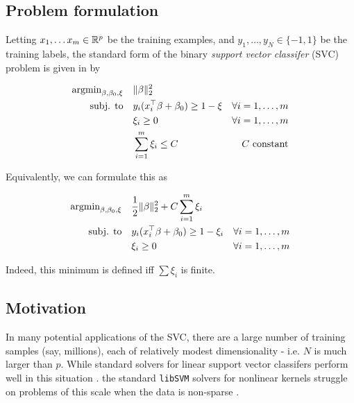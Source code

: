 \documentclass[11pt]{article}
\begin{document}
\subsection{Problem formulation}

Letting $x_1, \ldots x_m \in \mathbb{R}^p$ be the training examples, and $y_1, \ldots, y_N \in \{-1,1\}$ be the training labels, 
the standard form of the binary \emph{support vector classifer} (SVC) problem is given in   \cite{hastie2009elements} by

\begin{equation} \label{first_form}
\begin{aligned}
    \operatorname{argmin}_{\beta, \beta_0, \xi}  \quad 
    & \|\beta\|^2_2 & \\
    \textrm{subj. to} \quad 
    & y_i (x_i^\top \beta + \beta_0) \geq 1 - \xi & \forall i = 1, \ldots, m \\
    & \xi_i \geq 0  & \forall i = 1, \ldots, m \\
    & \sum_{i=1}^m \xi_i \leq C & C \textrm{ constant}
\end{aligned}
\end{equation}

Equivalently, we can formulate this as 

\begin{equation} \label{second_form}
\begin{aligned}
    \operatorname{argmin}_{\beta, \beta_0, \xi} \quad 
    & \frac{1}{2} \| \beta  \|_2^2 +  C \sum_{i=1}^m \xi_i & \\ 
    \textrm{subj. to}  \quad 
    & y_i (x_i^\top \beta + \beta_0) \geq 1 - \xi_i & \forall i = 1, \ldots, m \\
    & \xi_i \geq 0  & \forall i = 1, \ldots, m
\end{aligned}
\end{equation}

Indeed, this minimum is defined iff $\sum \xi_i$ is finite. 


\subsection{Motivation}

In many potential applications of the SVC, there are a large number of training samples (say, millions), 
each of relatively modest dimensionality - i.e. $N$ is much larger than $p$.
While standard solvers for linear support vector classifers perform well in this situation 
\cite{fan2008liblinear}.
the standard \texttt{libSVM} solvers for nonlinear kernels struggle on problems of this 
scale when the data is non-sparse \cite{chang2011libsvm}. \\
\end{document}
